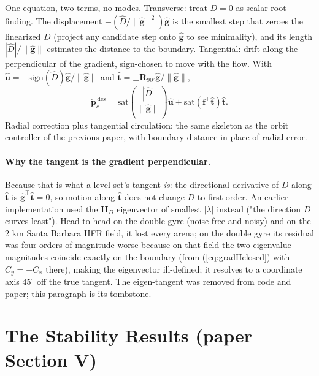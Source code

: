 \documentclass[11pt]{article}
\begin{document}
One equation, two terms, no modes. Transverse: treat $D = 0$ as scalar
root finding. The displacement $-(\hat{D}/\|\hat{\mathbf{g}}\|^2)
\hat{\mathbf{g}}$ is the smallest step that zeroes the linearized $D$
(project any candidate step onto $\hat{\mathbf{g}}$ to see minimality), and
its length $|\hat{D}|/\|\hat{\mathbf{g}}\|$ estimates the distance to the
boundary. Tangential: drift along the perpendicular of the gradient,
sign-chosen to move with the flow. With
$\hat{\mathbf{u}} = -\mathrm{sign}(\hat{D})\hat{\mathbf{g}}/
\|\hat{\mathbf{g}}\|$ and
$\hat{\mathbf{t}} = \pm\mathbf{R}_{90^\circ}\hat{\mathbf{g}}/
\|\hat{\mathbf{g}}\|$,
\begin{equation}
\dot{\mathbf{p}}_c^{\,\text{des}} =
\mathrm{sat}\!\left(\frac{|\hat{D}|}{\|\hat{\mathbf{g}}\|}\right)
\hat{\mathbf{u}}
+ \mathrm{sat}\!\left(\mathbf{f}^\top\hat{\mathbf{t}}\right)
\hat{\mathbf{t}} .
\end{equation}
Radial correction plus tangential circulation: the same skeleton as the
orbit controller of the previous paper, with boundary distance in place of
radial error.

\paragraph{Why the tangent is the gradient perpendicular.} Because that is
what a level set's tangent \emph{is}: the directional derivative of $D$
along $\hat{\mathbf{t}}$ is $\hat{\mathbf{g}}^\top\hat{\mathbf{t}} = 0$, so
motion along $\hat{\mathbf{t}}$ does not change $D$ to first order. An
earlier implementation used the $\mathbf{H}_D$ eigenvector of smallest
$|\lambda|$ instead ("the direction $D$ curves least"). Head-to-head on the
double gyre (noise-free and noisy) and on the 2 km Santa Barbara HFR field,
it lost every arena; on the double gyre its residual was four orders of
magnitude worse because on that field the two eigenvalue magnitudes
coincide exactly on the boundary (from (\ref{eq:gradHclosed}) with
$C_y = -C_x$ there), making the eigenvector ill-defined; it resolves to a
coordinate axis $45^\circ$ off the true tangent. The eigen-tangent was
removed from code and paper; this paragraph is its tombstone.

\section{The Stability Results (paper Section V)}
\end{document}
